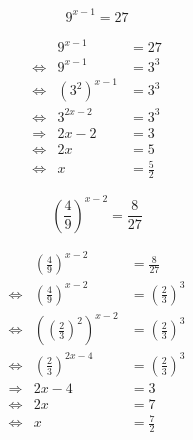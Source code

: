 \begin{uebung}
	\begin{question}
		\[
			9^{x-1} = 27
		\]
	\end{question}

	\begin{solution}
		\begin{equation*}
			\begin{array}{lrl}
				                & 9^{x-1}       & = 27          \\
				\Leftrightarrow & 9^{x-1}       & = 3^3         \\
				\Leftrightarrow & {(3^2)}^{x-1} & = 3^3         \\
				\Leftrightarrow & 3^{2x-2}      & = 3^3         \\
				\Rightarrow     & 2x-2          & = 3           \\
				\Leftrightarrow & 2x            & = 5           \\
				\Leftrightarrow & x             & = \frac{5}{2}
			\end{array}
		\end{equation*}
	\end{solution}

	\begin{question}
		\[
			{\left(\frac{4}{9}\right)}^{x-2} = \frac{8}{27}
		\]
	\end{question}

	\begin{solution}
		\begin{equation*}
			\begin{array}{lrl}
				                & {\left(\frac{4}{9}\right)}^{x-2}                    & = \frac{8}{27} \\
				\Leftrightarrow & {\left(\frac{4}{9}\right)}^{x-2}                    & =
				{\left(\frac{2}{3}\right)}^{3}                                                         \\
				\Leftrightarrow & {\left({\left(\frac{2}{3}\right)}^{2}\right)}^{x-2} & =
				{\left(\frac{2}{3}\right)}^{3}                                                         \\
				\Leftrightarrow & {\left(\frac{2}{3}\right)}^{2x-4}                   & =
				{\left(\frac{2}{3}\right)}^{3}                                                         \\
				\Rightarrow     & 2x-4                                                & = 3            \\
				\Leftrightarrow & 2x                                                  & = 7            \\
				\Leftrightarrow & x                                                   & = \frac{7}{2}
			\end{array}
		\end{equation*}
	\end{solution}


\end{uebung}
